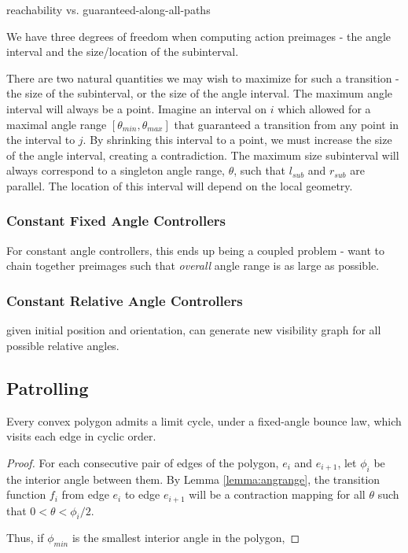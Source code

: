 \documentclass[]{styles/svproc}  %
\begin{document}
reachability vs. guaranteed-along-all-paths

We have three degrees of freedom when computing action preimages - the angle
interval and the size/location of the subinterval.

There are two natural quantities we may wish to maximize for such a transition -
the size of the subinterval, or the size of the angle interval.
The maximum angle interval will always be a point. Imagine an interval on $i$
which allowed for a maximal angle range $[\theta_{min}, \theta_{max}]$ that
guaranteed a transition from any point in the interval to $j$. By
shrinking this interval to a point, we must increase the size of the angle
interval, creating a contradiction. The maximum size subinterval will always correspond to a singleton angle range,
$\theta$, such that $l_{sub}$ and $r_{sub}$ are parallel. The location of this
interval will depend on the local geometry.


\subsubsection{Constant Fixed Angle Controllers}

For constant angle controllers, this
ends up being a coupled problem - want to chain together preimages such that
\emph{overall} angle range is as large as possible.

\subsubsection{Constant Relative Angle Controllers}

given initial position and orientation, can generate new visibility graph for
all possible relative angles.

\subsection{Patrolling \label{sec:cycles}}

\begin{proposition}
Every convex polygon admits a limit cycle, under a fixed-angle bounce law, 
which visits each edge in cyclic order.
\end{proposition}

\begin{proof}

For each consecutive pair of edges of the polygon, $e_i$ and $e_{i+1}$, let
$\phi_i$ be the interior angle between them. By Lemma \ref{lemma:angrange}, the
transition function $f_i$ from edge $e_i$ to edge $e_{i+1}$ will be a
contraction mapping for all $\theta$ such that $0 < \theta < \phi_i/2$.

Thus, if
$\phi_{min}$ is the smallest interior angle in the polygon, 

\end{proof}
\end{document}
